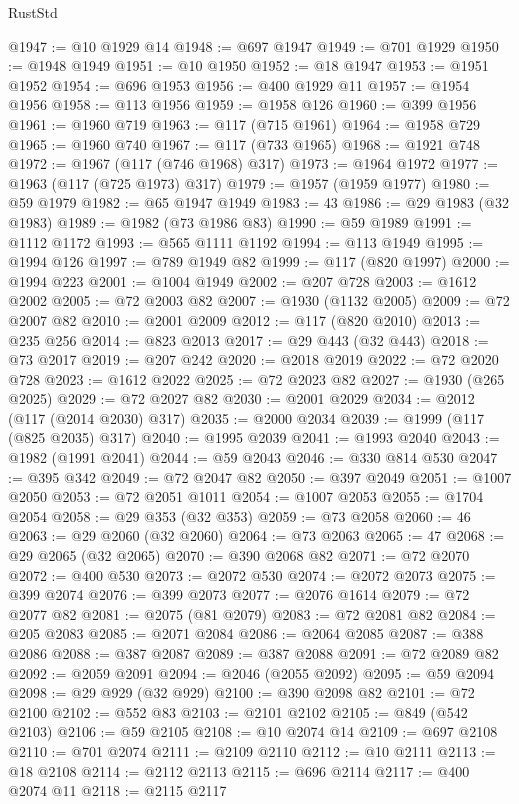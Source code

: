 \begin{lexlean}{RustStd}
\begin{coremodule}
@1947 := @10 @1929 @14
@1948 := @697 @1947
@1949 := @701 @1929
@1950 := @1948 @1949
@1951 := @10 @1950
@1952 := @18 @1947
@1953 := @1951 @1952
@1954 := @696 @1953
@1956 := @400 @1929 @11
@1957 := @1954 @1956
@1958 := @113 @1956
@1959 := @1958 @126
@1960 := @399 @1956
@1961 := @1960 @719
@1963 := @117 (@715 @1961)
@1964 := @1958 @729
@1965 := @1960 @740
@1967 := @117 (@733 @1965)
@1968 := @1921 @748
@1972 := @1967 (@117 (@746 @1968) @317)
@1973 := @1964 @1972
@1977 := @1963 (@117 (@725 @1973) @317)
@1979 := @1957 (@1959 @1977)
@1980 := @59 @1979
@1982 := @65 @1947 @1949
@1983 := 43
@1986 := @29 @1983 (@32 @1983)
@1989 := @1982 (@73 @1986 @83)
@1990 := @59 @1989
@1991 := @1112 @1172
@1993 := @565 @1111 @1192
@1994 := @113 @1949
@1995 := @1994 @126
@1997 := @789 @1949 @82
@1999 := @117 (@820 @1997)
@2000 := @1994 @223
@2001 := @1004 @1949
@2002 := @207 @728
@2003 := @1612 @2002
@2005 := @72 @2003 @82
@2007 := @1930 (@1132 @2005)
@2009 := @72 @2007 @82
@2010 := @2001 @2009
@2012 := @117 (@820 @2010)
@2013 := @235 @256
@2014 := @823 @2013
@2017 := @29 @443 (@32 @443)
@2018 := @73 @2017
@2019 := @207 @242
@2020 := @2018 @2019
@2022 := @72 @2020 @728
@2023 := @1612 @2022
@2025 := @72 @2023 @82
@2027 := @1930 (@265 @2025)
@2029 := @72 @2027 @82
@2030 := @2001 @2029
@2034 := @2012 (@117 (@2014 @2030) @317)
@2035 := @2000 @2034
@2039 := @1999 (@117 (@825 @2035) @317)
@2040 := @1995 @2039
@2041 := @1993 @2040
@2043 := @1982 (@1991 @2041)
@2044 := @59 @2043
@2046 := @330 @814 @530
@2047 := @395 @342
@2049 := @72 @2047 @82
@2050 := @397 @2049
@2051 := @1007 @2050
@2053 := @72 @2051 @1011
@2054 := @1007 @2053
@2055 := @1704 @2054
@2058 := @29 @353 (@32 @353)
@2059 := @73 @2058
@2060 := 46
@2063 := @29 @2060 (@32 @2060)
@2064 := @73 @2063
@2065 := 47
@2068 := @29 @2065 (@32 @2065)
@2070 := @390 @2068 @82
@2071 := @72 @2070
@2072 := @400 @530
@2073 := @2072 @530
@2074 := @2072 @2073
@2075 := @399 @2074
@2076 := @399 @2073
@2077 := @2076 @1614
@2079 := @72 @2077 @82
@2081 := @2075 (@81 @2079)
@2083 := @72 @2081 @82
@2084 := @205 @2083
@2085 := @2071 @2084
@2086 := @2064 @2085
@2087 := @388 @2086
@2088 := @387 @2087
@2089 := @387 @2088
@2091 := @72 @2089 @82
@2092 := @2059 @2091
@2094 := @2046 (@2055 @2092)
@2095 := @59 @2094
@2098 := @29 @929 (@32 @929)
@2100 := @390 @2098 @82
@2101 := @72 @2100
@2102 := @552 @83
@2103 := @2101 @2102
@2105 := @849 (@542 @2103)
@2106 := @59 @2105
@2108 := @10 @2074 @14
@2109 := @697 @2108
@2110 := @701 @2074
@2111 := @2109 @2110
@2112 := @10 @2111
@2113 := @18 @2108
@2114 := @2112 @2113
@2115 := @696 @2114
@2117 := @400 @2074 @11
@2118 := @2115 @2117

\end{coremodule}
\end{lexlean}
